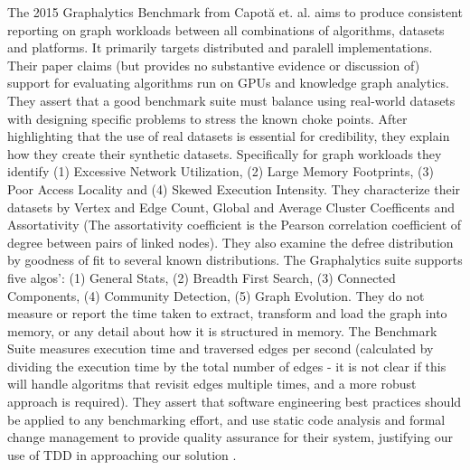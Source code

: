 \documentclass[sigconf,anonymous, authordraft]{acmart}
\begin{document}
\par{The 2015 Graphalytics Benchmark from Capot{\u{a}} et. al. aims to produce consistent reporting on graph workloads between all combinations of algorithms, datasets and platforms. 
It primarily targets distributed and paralell implementations. 
Their paper claims (but provides no substantive evidence or discussion of) support for evaluating algorithms run on GPUs and knowledge graph analytics. 
They assert that a good benchmark suite must balance using real-world datasets with designing specific problems to stress the known choke points. 
After highlighting that the use of real datasets is essential for credibility, they explain how they create their synthetic datasets.
Specifically for graph workloads they identify (1) Excessive Network Utilization, (2) Large Memory Footprints, (3) Poor Access Locality and (4) Skewed Execution Intensity. 
They characterize their datasets by Vertex and Edge Count, Global and Average Cluster Coefficents and Assortativity (The assortativity coefficient is the Pearson correlation coefficient of degree between pairs of linked nodes). 
They also examine the defree distribution by goodness of fit to several known distributions. 
The Graphalytics suite supports five algos': (1) General Stats, (2) Breadth First Search, (3) Connected Components, (4) Community Detection, (5) Graph Evolution. 
They do not measure or report the time taken to extract, transform and load the graph into memory, or any detail about how it is structured in memory. 
The Benchmark Suite measures execution time and traversed edges per second (calculated by dividing the execution time by the total number of edges - it is not clear if this will handle algoritms that revisit edges multiple times, and a more robust approach is required). 
They assert that software engineering best practices should be applied to any benchmarking effort, and use static code analysis and formal change management to provide quality assurance for their system, justifying our use of TDD in approaching our solution \cite{Capota2015}.}
\end{document}
